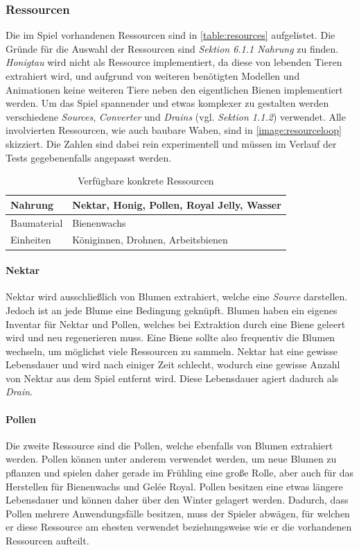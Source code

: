 \subsubsection{Ressourcen}
Die im Spiel vorhandenen Ressourcen sind in \autoref{table:resources} aufgelistet. Die Gründe für die Auswahl der Ressourcen sind \textit{Sektion 6.1.1 Nahrung} zu finden. \textit{Honigtau} wird nicht als Ressource implementiert, da diese von lebenden Tieren extrahiert wird, und aufgrund von weiteren benötigten Modellen und Animationen keine weiteren Tiere neben den eigentlichen Bienen implementiert werden. Um das Spiel spannender und etwas komplexer zu gestalten werden verschiedene \textit{Sources}, \textit{Converter} und \textit{Drains} (vgl. \textit{Sektion 1.1.2}) verwendet. Alle involvierten Ressourcen, wie auch baubare Waben, sind in \autoref{image:resourceloop} skizziert. Die Zahlen sind dabei rein experimentell und müssen im Verlauf der Tests gegebenenfalls angepasst werden.

\begin{table}[]
    \centering
    \caption{Verfügbare konkrete Ressourcen}
    \label{table:resources}
    \begin{tabular}{|l|l|}
    \hline
    Nahrung     & Nektar, Honig, Pollen, Royal Jelly, Wasser \\ \hline
    Baumaterial & Bienenwachs                                \\ \hline
    Einheiten   & Königinnen, Drohnen, Arbeitsbienen         \\ \hline
    \end{tabular}
\end{table}

\paragraph{Nektar}
Nektar wird ausschließlich von Blumen extrahiert, welche eine \textit{Source} darstellen. Jedoch ist an jede Blume eine Bedingung geknüpft. Blumen haben ein eigenes Inventar für Nektar und Pollen, welches bei Extraktion durch eine Biene geleert wird und neu regenerieren muss. Eine Biene sollte also frequentiv die Blumen wechseln, um möglichst viele Ressourcen zu sammeln. Nektar hat eine gewisse Lebensdauer und wird nach einiger Zeit schlecht, wodurch eine gewisse Anzahl von Nektar aus dem Spiel entfernt wird. Diese Lebensdauer agiert dadurch als \textit{Drain}.

\paragraph{Pollen}
Die zweite Ressource sind die Pollen, welche ebenfalls von Blumen extrahiert werden. Pollen können unter anderem verwendet werden, um neue Blumen zu pflanzen und spielen daher gerade im Frühling eine große Rolle, aber auch für das Herstellen für Bienenwachs und Gelée Royal. Pollen besitzen eine etwas längere Lebensdauer und können daher über den Winter gelagert werden. Dadurch, dass Pollen mehrere Anwendungsfälle besitzen, muss der Spieler abwägen, für welchen er diese Ressource am ehesten verwendet beziehungsweise wie er die vorhandenen Ressourcen aufteilt.

